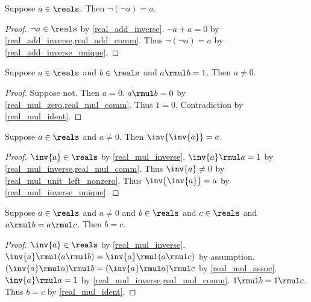 \begin{theorem}\label{real_neg_neg}
    Suppose $a\in\reals$.
    Then $\neg{(\neg{a})} = a$.
\end{theorem}
\begin{proof}
    $\neg{a}\in\reals$ by \cref{real_add_inverse}.
    $\neg{a} + a = 0$ by \cref{real_add_inverse,real_add_comm}.
    Thus $\neg{(\neg{a})} = a$ by \cref{real_add_inverse_unique}.
\end{proof}

\begin{lemma}\label{real_mul_unit_left_nonzero}
    Suppose $a\in\reals$ and $b\in\reals$ and $a \rmul b = 1$.
    Then $a \neq 0$.
\end{lemma}
\begin{proof}
    Suppose not.
    Then $a = 0$.
    $a \rmul b = 0$ by \cref{real_mul_zero,real_mul_comm}.
    Thus $1 = 0$.
    Contradiction by \cref{real_mul_ident}.
\end{proof}

\begin{theorem}\label{real_inv_inv}
    Suppose $a\in\reals$ and $a\neq 0$.
    Then $\inv{\inv{a}} = a$.
\end{theorem}
\begin{proof}
    $\inv{a}\in\reals$ by \cref{real_mul_inverse}.
    $\inv{a} \rmul a = 1$ by \cref{real_mul_inverse,real_mul_comm}.
    Thus $\inv{a} \neq 0$ by \cref{real_mul_unit_left_nonzero}.
    Thus $\inv{\inv{a}} = a$ by \cref{real_mul_inverse_unique}.
\end{proof}

\begin{theorem}\label{real_mul_cancel}
    Suppose $a\in\reals$ and $a\neq 0$ and $b\in\reals$ and $c\in\reals$ and $a \rmul b = a \rmul c$.
    Then $b = c$.
\end{theorem}
\begin{proof}
    $\inv{a}\in\reals$ by \cref{real_mul_inverse}.
    $\inv{a} \rmul (a \rmul b) = \inv{a} \rmul (a \rmul c)$ by assumption.
    $(\inv{a} \rmul a) \rmul b = (\inv{a} \rmul a) \rmul c$ by \cref{real_mul_assoc}.
    $\inv{a} \rmul a = 1$ by \cref{real_mul_inverse,real_mul_comm}.
    $1 \rmul b = 1 \rmul c$.
    Thus $b = c$ by \cref{real_mul_ident}.
\end{proof}

